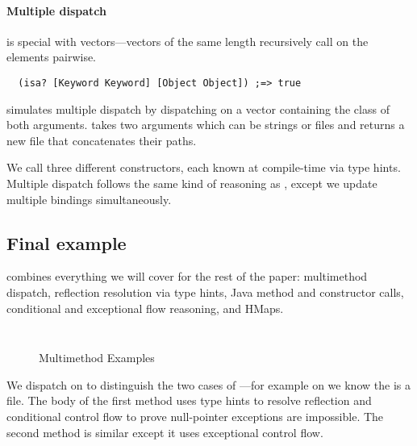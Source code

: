 \paragraph{Multiple dispatch}  is special with vectors---vectors of the
same length recursively call  on the elements pairwise.
\begin{verbatim}
  (isa? [Keyword Keyword] [Object Object]) ;=> true
\end{verbatim}

simulates multiple dispatch by dispatching on
a vector containing the class of both arguments. 
takes two arguments which can be strings or files and returns
a new file that concatenates their paths.

We call three different  constructors, each known at compile-time
via type hints.
Multiple dispatch follows the same kind of reasoning as ,
except we update multiple bindings simultaneously.

\subsection{Final example}

combines everything we will cover for the rest of the paper:
multimethod dispatch, reflection resolution via type hints, Java method
and constructor calls, conditional and exceptional flow reasoning,
and HMaps. 


\begin{figure}
\begin{exmp}
\inputminted[firstline=6,lastline=22]{clojure}{code/demo/src/demo/eg7.clj}
\label{example:multidispatch}
\end{exmp}
\begin{exmp}
\inputminted[firstline=6,lastline=20]{clojure}{code/demo/src/demo/eg8.clj}
\label{example:final}
\end{exmp}
\caption{Multimethod Examples}
\end{figure}

We dispatch on  to distinguish the two cases of ---for example on 
we know the  is a file.
The body of the first method uses type hints to resolve reflection
and conditional control flow to prove null-pointer exceptions are impossible.
The second method is similar except it uses exceptional control flow.
